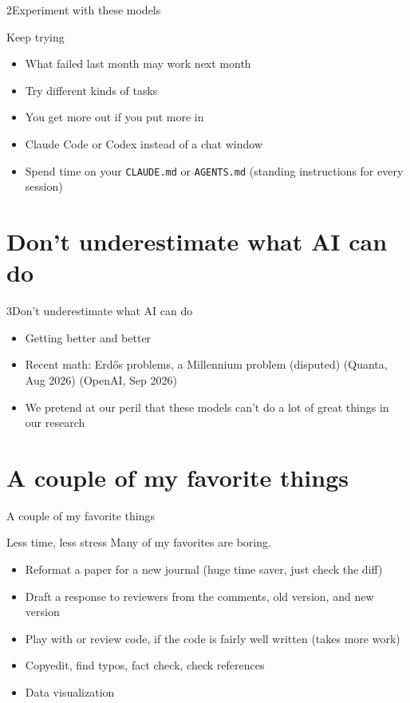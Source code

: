 \documentclass[11pt]{beamer}
\newcommand{\srccite}[1]{{\scriptsize\textcolor{citecol}{#1}}}
\begin{document}
\begin{transition}{2}{Experiment with these models}
\end{transition}


\begin{frame}{Keep trying}
\pause
\begin{itemize}\setlength\itemsep{10pt}
\item What failed last month may work next month \pause
\item Try different kinds of tasks \pause
\item You get more out if you put more in \pause
\item Claude Code or Codex instead of a chat window \pause
\item Spend time on your \texttt{CLAUDE.md} or \texttt{AGENTS.md} (standing instructions for every session)
\end{itemize}
\end{frame}


\section{Don't underestimate what AI can do}

\begin{transition}{3}{Don't underestimate what AI can do}
\pause
\begin{itemize}\setlength\itemsep{8pt}
\item Getting better and better \pause
\item Recent math: Erd\H{o}s problems, a Millennium problem (disputed) \srccite{(Quanta, Aug 2026)} \srccite{(OpenAI, Sep 2026)} \pause
\item We pretend at our peril that these models can't do a lot of great things in our research
\end{itemize}
\end{transition}


\section{A couple of my favorite things}

\begin{transition}{}{A couple of my favorite things}
\end{transition}


\begin{frame}{Less time, less stress}
Many of my favorites are boring.
\medskip
\pause
\begin{itemize}\setlength\itemsep{8pt}
\item Reformat a paper for a new journal (huge time saver, just check the diff) \pause
\item Draft a response to reviewers from the comments, old version, and new version \pause
\item Play with or review code, if the code is fairly well written (takes more work) \pause
\item Copyedit, find typos, fact check, check references \pause
\item Data visualization
\end{itemize}
\end{frame}
\end{document}

